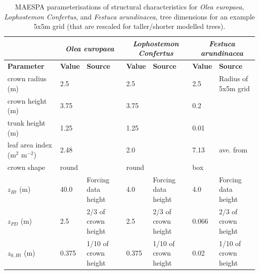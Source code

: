 \documentclass[final,3p,times,authoryear]{elsarticle}
\begin{document}
\begin{center}
\begin{table}[!htbp]
\caption{MAESPA parameterisations of structural characteristics for \textit{Olea europaea}, \textit{Lophostemon Confertus}, and \textit{Festuca arundinacea}, tree dimensions for an example 5x5m grid (that are rescaled for taller/shorter modelled trees).\label{tab:olivescaled}}
\begin{tabular}{ |  p{2.5cm} | p{1.1cm} | p{2.5cm} | p{1.1cm} | p{2.5cm} | p{1.1cm} | p{2.5cm} | }

\hline & \multicolumn{2}{|c|}{\textit{Olea europaea}} & \multicolumn{2}{|c|}{\textit{Lophostemon Confertus}} &\multicolumn{2}{|c|}{\textit{Festuca arundinacea}}   \\ \hline

\hline \textbf{Parameter} & \textbf{Value} & \textbf{Source} & \textbf{Value} & \textbf{Source}& \textbf{Value} & \textbf{Source} \\ 
\hline
crown radius (m) & 2.5 & \cite{Coutts2014a}  & 2.5 &\cite{Coutts2016} & 2.5& Radius of 5x5m grid  \\ \hline
crown height (m) & 3.75 & \cite{Coutts2014a}  & 3.75&\cite{Coutts2016} & 0.2& \cite{Simmons2011}  \\ \hline
trunk height (m) & 1.25 & \cite{Coutts2014a}  & 1.25&\cite{Coutts2016} & 0.01&  \\ \hline
leaf area index (m$^{2}$ m$^{-2}$)&2.48 &\cite{Mariscal2000}  &2.0&\cite{Wright2000} &  7.13 & ave. from \cite{Bijoor2014} \\ \hline
crown shape & round &  & round & & box&  \\ \hline
$z_{Ht}$ (m)&40.0&Forcing data height   &4.0&Forcing data height &4.0&Forcing data height \\ \hline
$z_{PD}$ (m) &2.5& 2/3 of crown height \citep{Grimmond1999}  &2.5 & 2/3 of crown height \citep{Grimmond1999} &0.066 & 2/3 of crown height \citep{Grimmond1999} \\ \hline
$z_{0,Ht}$ (m) &0.375& 1/10 of crown height \citep{Grimmond1999}  &0.375 & 1/10 of crown height \citep{Grimmond1999}  & 0.02 & 1/10 of crown height \citep{Grimmond1999}  \\ \hline
\end{tabular} 
\end{table}
\end{center}
\end{document}
